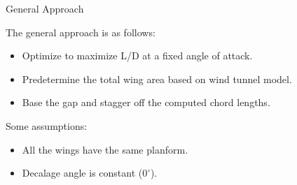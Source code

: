 \begin{frame}{General Approach}

The general approach is as follows:

\begin{itemize}
    \item Optimize to maximize L/D at a fixed angle of attack.
    \vspace{5pt}
    \item Predetermine the total wing area based on wind tunnel model.
    \vspace{5pt}
    \item Base the gap and stagger off the computed chord lengths.
\end{itemize}

\vspace{15pt}
\noindent Some assumptions:

\begin{itemize}
    \item All the wings have the same planform.
    \vspace{5pt}
    \item Decalage angle is constant ($0^\circ$).
\end{itemize}

\end{frame}
